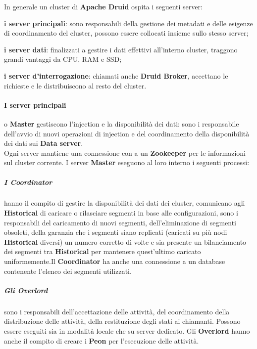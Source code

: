 In generale un \gls{cluster}{} di \textbf{Apache Druid} ospita i seguenti server: 
\begin{list}{*}
    \item \textbf{i server principali}: sono responsabili della gestione dei \gls{metadati}{} e delle esigenze di coordinamento del \gls{cluster}{}, possono essere collocati insieme sullo stesso server;
    \item \item \textbf{i server dati}: finalizzati a  gestire i dati effettivi all'interno \gls{cluster}{}, traggono grandi vantaggi da CPU, RAM e SSD;
    \item  \textbf{i server d'interrogazione}: chiamati anche \textbf{Druid Broker}, accettano le richieste e le distribuiscono al resto del cluster.
\end{list}
\paragraph{I server principali} o \textbf{Master} gestiscono l’\gls{injection}{} e la disponibilità dei dati: sono i responsabile dell’avvio
di nuovi operazioni di \gls{injection}{} e del coordinamento della disponibilità dei dati sui \textbf{Data server}.\\
Ogni server mantiene una connessione con a un \textbf{Zookeeper} per le informazioni sul \gls{cluster}{} corrente.
I server \textbf{Master} eseguono al loro interno i seguenti processi:
\subparagraph{I Coordinator} hanno il compito di gestire la disponibilità dei dati dei \gls{cluster}{}, comunicano
agli \textbf{Historical} di caricare o rilasciare segmenti in base alle configurazioni, sono i 
responsabili del caricamento di nuovi segmenti, dell’eliminazione di segmenti obsoleti, della
garanzia che i segmenti siano replicati (caricati su più nodi \textbf{Historical} diversi) un
numero corretto  di volte e sia presente un bilanciamento dei segmenti
tra \textbf{Historical} per mantenere quest’ultimo caricato uniformemente.Il \textbf{Coordinator} ha anche una connessione a un database
contenente l’elenco dei segmenti utilizzati. 
\subparagraph{Gli Overlord} sono i responsabili dell’accettazione delle attività, del coordinamento della distribuzione delle
attività, della restituzione degli stati ai
chiamanti. Possono essere eseguiti sia in modalità locale che su server dedicato. Gli \textbf{Overlord} hanno anche il compito di 
creare i \textbf{Peon} per l'esecuzione delle attività. 
